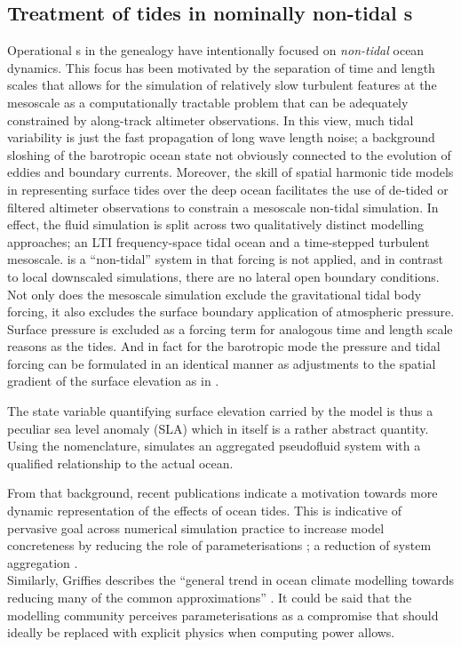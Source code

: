 \subsection{Treatment of tides in nominally non-tidal \OGCM{}s}
\label{sec:tides_ogcm}
Operational \OGCM{}s in the \GODAE{} genealogy have intentionally focused on \emph{non-tidal} ocean dynamics. This focus has been motivated by the separation of time and length scales that allows for the simulation of relatively slow turbulent features at the mesoscale as a computationally tractable problem that can be adequately constrained by along-track altimeter observations.
In this view, much tidal variability is just the fast propagation of long wave length noise; a background sloshing of the barotropic ocean state not obviously connected to the evolution of eddies and boundary currents.
Moreover, the skill of spatial harmonic tide models in representing surface tides over the deep ocean facilitates the use of de-tided or filtered altimeter observations to constrain a mesoscale non-tidal simulation. In effect, the fluid simulation is split across two qualitatively distinct modelling approaches; an LTI frequency-space tidal ocean and a time-stepped turbulent mesoscale.  
\BL{} is a ``non-tidal'' system in that \ATGP{} forcing is not applied, and in contrast to local downscaled simulations, there are no lateral open boundary conditions. Not only does the mesoscale simulation exclude the gravitational tidal body forcing, it also excludes the surface boundary application of atmospheric pressure.   
Surface pressure is excluded as a forcing term for analogous time and length scale reasons as the tides.  And in fact for the barotropic mode the pressure and tidal forcing can be formulated in an identical manner as adjustments to the spatial gradient of the surface elevation as in \citet[Eq9.9.5]{gill1982atmosphere}.

The state variable quantifying surface elevation carried by the model is thus a peculiar sea level anomaly (SLA) which in itself is a rather abstract quantity. 
Using the \citet{Stevens:2001kb} nomenclature, \BL{} simulates an aggregated pseudofluid system with a qualified relationship to the actual ocean.


From that background, recent publications indicate a motivation towards more dynamic representation of the effects of ocean tides.   This is indicative of pervasive goal across numerical simulation practice to increase model concreteness by reducing the role of parameterisations \cite[section 5.3]{Petersen:2012tr}; a reduction of system aggregation \citep{Stevens:2001kb}.\\
Similarly, Griffies describes the ``general trend in ocean climate modelling towards reducing many of the common approximations'' \citep[pp20] {Griffies:2004vs}.   It could be said that the modelling community perceives parameterisations as a compromise that should ideally be replaced with explicit physics when computing power allows.

